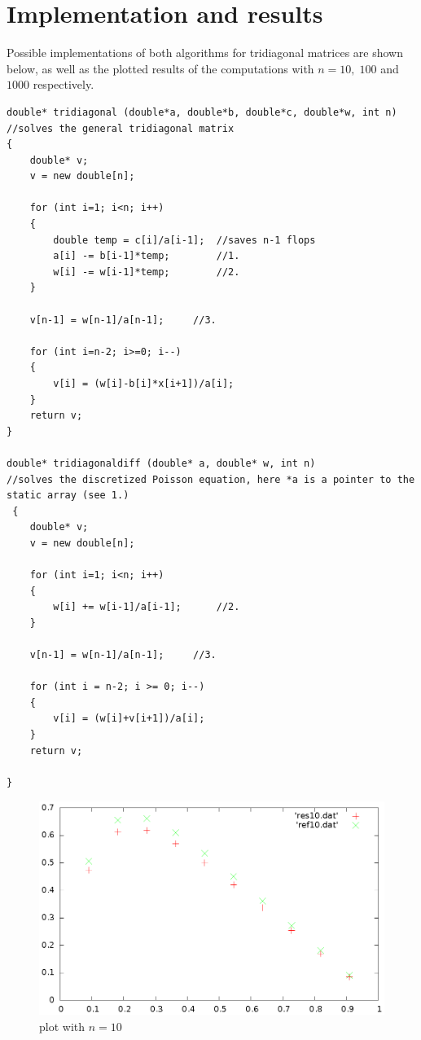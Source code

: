 \documentclass[11pt,a4wide]{article}
\begin{document}
\section{Implementation and results}
Possible implementations of both algorithms for tridiagonal matrices are shown below, as well as the plotted results of the computations with $n=10,\;100$ and $1000$ respectively.
\begin{lstlisting}[title={solvers for tridiagonal matrices}]
double* tridiagonal (double*a, double*b, double*c, double*w, int n) 	//solves the general tridiagonal matrix
{
    double* v;
    v = new double[n];

    for (int i=1; i<n; i++)
    {
        double temp = c[i]/a[i-1];	//saves n-1 flops
        a[i] -= b[i-1]*temp;		//1.
        w[i] -= w[i-1]*temp;		//2.
    }

    v[n-1] = w[n-1]/a[n-1];		//3.		

    for (int i=n-2; i>=0; i--)
    {
        v[i] = (w[i]-b[i]*x[i+1])/a[i];
    }
    return v;
}

double* tridiagonaldiff (double* a, double* w, int n)	
//solves the discretized Poisson equation, here *a is a pointer to the static array (see 1.)
 {
    double* v;
    v = new double[n];

    for (int i=1; i<n; i++)
    {
        w[i] += w[i-1]/a[i-1];		//2.
    }

    v[n-1] = w[n-1]/a[n-1];		//3.

    for (int i = n-2; i >= 0; i--)
    {
        v[i] = (w[i]+v[i+1])/a[i];
    }
    return v;

}
\end{lstlisting}
\begin{figure}[b]
	\centering
\includegraphics[scale=0.5,angle=-90]{plot10.eps}
\caption{plot with $n=10$}
	\label{fig:plot10}
\end{figure}
\end{document}
